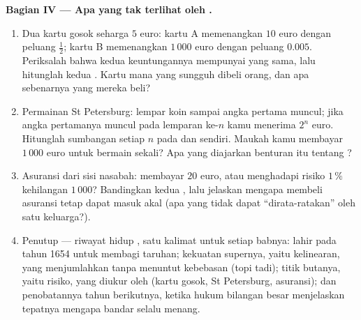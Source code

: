\begin{problem}
\medskip
\noindent\textbf{Bagian IV --- Apa yang tak terlihat oleh .}
\begin{enumerate}[resume]
  \item Dua kartu gosok seharga $5$ euro: kartu A memenangkan $10$ euro dengan
        peluang $\frac12$; kartu B memenangkan $1\,000$ euro dengan
        peluang $0.005$. Periksalah bahwa kedua keuntungannya mempunyai
         yang sama, lalu hitunglah kedua . Kartu
        mana yang sungguh dibeli orang, dan apa sebenarnya yang mereka beli?
  \item Permainan St Petersburg: lempar koin sampai angka pertama muncul;
        jika angka pertamanya muncul pada lemparan ke-$n$ kamu menerima
        $2^n$ euro. Hitunglah sumbangan setiap $n$ pada
         dan  sendiri. Maukah kamu
        membayar $1\,000$ euro untuk bermain sekali? Apa yang diajarkan
        benturan itu tentang ?
  \item Asuransi dari sisi nasabah: membayar $20$ euro, atau
        menghadapi risiko $1\,\%$ kehilangan $1\,000$? Bandingkan kedua
        , lalu jelaskan mengapa membeli asuransi tetap dapat
        masuk akal (apa yang tidak dapat ``dirata-ratakan'' oleh satu keluarga?).
  \item Penutup --- riwayat hidup , satu kalimat untuk setiap
        babnya: lahir pada tahun 1654 untuk membagi taruhan; kekuatan supernya,
        yaitu kelinearan, yang menjumlahkan  tanpa menuntut
        kebebasan (topi tadi); titik butanya, yaitu risiko, yang diukur oleh
         (kartu gosok, St Petersburg, asuransi); dan penobatannya tahun
        berikutnya, ketika hukum bilangan besar menjelaskan tepatnya mengapa
        bandar selalu menang.

\end{enumerate}
\end{problem}

